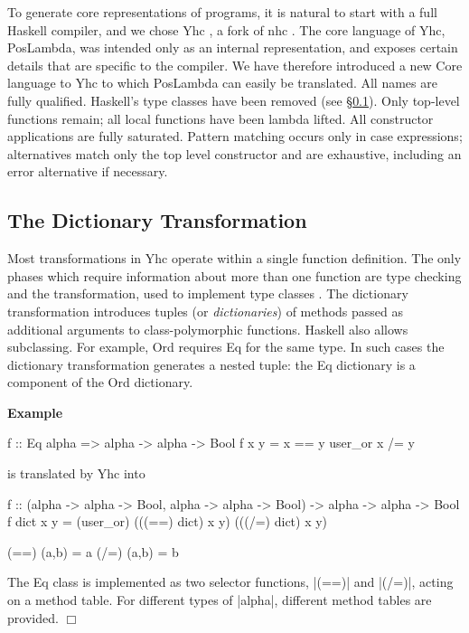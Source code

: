 \documentclass[preprint]{sigplanconf}
\newcommand{\C}[1]{\textsf{#1}}
\newcounter{exmp}
\newcommand{\yesexample}{\addtocounter{exmp}{1}\addvspace{2mm}\noindent\textbf{Example \arabic{exmp}}}
\newcommand{\noexample}{\hfill$\Box$\par\addvspace{2mm}}
\newenvironment{example}{\yesexample}{\noexample}
\begin{document}
To generate core representations of programs, it is natural to start with a full Haskell compiler, and we chose Yhc \citep{Yhc}, a fork of nhc \citep{nhc}. The core language of Yhc, PosLambda, was intended only as an internal representation, and exposes certain details that are specific to the compiler. We have therefore introduced a new Core language to Yhc to which PosLambda can easily be translated. All names are fully qualified. Haskell's type classes have been removed (see \S\ref{sec:dict}). Only top-level functions remain; all local functions have been lambda lifted. All constructor applications are fully saturated. Pattern matching occurs only in case expressions; alternatives match only the top level constructor and are exhaustive, including an \C{error} alternative if necessary.


\subsection{The Dictionary Transformation}
\label{sec:dict}

Most transformations in Yhc operate within a single function definition. The only phases which require information about more than one function are type checking and the transformation, used to implement type classes \citep{wadler:type_classes}. The dictionary transformation introduces tuples (or \textit{dictionaries}) of methods passed as additional arguments to class-polymorphic functions. Haskell also allows subclassing. For example, \C{Ord} requires \C{Eq} for the same type. In such cases the dictionary transformation generates a nested tuple: the \C{Eq} dictionary is a component of the \C{Ord} dictionary.

\begin{example}
\begin{code}
f :: Eq alpha => alpha -> alpha -> Bool
f x y = x == y user_or x /= y
\end{code}

\noindent is translated by Yhc into

\begin{code}
f :: (alpha -> alpha -> Bool, alpha -> alpha -> Bool) -> alpha -> alpha -> Bool
f dict x y = (user_or) (((==) dict) x y) (((/=) dict) x y)

(==) (a,b) = a
(/=) (a,b) = b
\end{code}

The \C{Eq} class is implemented as two selector functions, |(==)| and |(/=)|, acting on a method table. For different types of |alpha|, different method tables are provided.
\end{example}
\end{document}
